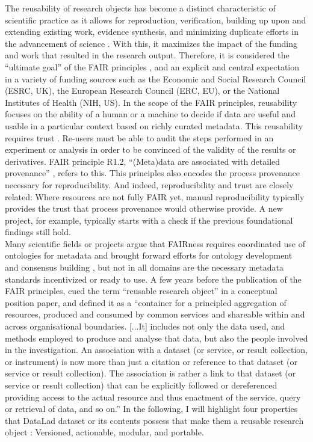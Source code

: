 The reusability of research objects has become a distinct characteristic of scientific practice as it allows for reproduction, verification, building up upon and extending existing work, evidence synthesis, and minimizing duplicate efforts in the advancement of science \citep{thanos2017research}.
With this, it maximizes the impact of the funding and work that resulted in the research output.
Therefore, it is considered the “ultimate goal” of the FAIR principles \citep{wilkinson2016fair}, and an explicit and central expectation in a variety of funding sources such as the Economic and Social Research Council (ESRC, UK), the European Research Council (ERC, EU), or the National Institutes of Health (NIH, US).
In the scope of the FAIR principles, reusability focuses on the ability of a human or a machine to decide if data are useful and usable in a particular context based on richly curated metadata.
This reusability requires trust \citep{bechhofer2010research}. Re-users must be able to audit the steps performed in an experiment or analysis in order to be convinced of the validity of the results or derivatives.
FAIR principle R1.2, ``(Meta)data are associated with detailed provenance'' \citep{wilkinson2016fair}, refers to this.
This principles also encodes the process provenance necessary for reproducibility.
And indeed, reproducibility and trust are closely related:
Where resources are not fully FAIR yet, manual reproducibility typically provides the trust that process provenance would otherwise provide.
A new project, for example, typically starts with a check if the previous foundational findings still hold.\\
Many scientific fields or projects argue that FAIRness requires coordinated use of ontologies for metadata and brought forward efforts for ontology development and consensus building \citep[e.g.,][]{wise2019implementation, abrams2022standards, papadiamantis2020metadata}, but not in all domains are the necessary metadata standards incentivized or ready to use.
A few years before the publication of the FAIR principles, \citet{bechhofer2013linked} cued the term ``reusable research object'' in a conceptual position paper, and defined it as a ``container for a principled aggregation of resources, produced and consumed by common services and shareable within and across organisational boundaries. [...It] includes not only the data used, and methods employed to produce and analyse that data, but also the people involved in the investigation. An association with a dataset (or service, or result collection, or instrument) is now more than just a citation or reference to that dataset (or service or result collection). The association is rather a link to that dataset (or service or result collection) that can be explicitly followed or dereferenced providing access to the actual resource and thus enactment of the service, query or retrieval of data, and so on.''
In the following, I will highlight four properties that DataLad dataset or its contents possess that make them a reusable research object \citep{wagnerohbm2021}: Versioned, actionable, modular, and portable.


